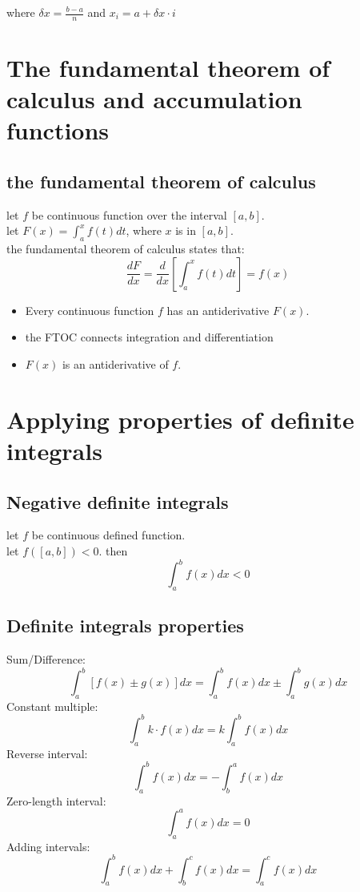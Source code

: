 \documentclass{article}
\begin{document}
                where  \(\delta x = \frac{b - a}{n}\) and \(x_i = a + \delta x \cdot i\)
        \section{The fundamental theorem of calculus and accumulation functions}
                \subsection{the fundamental theorem of calculus}
                    let \(f\) be continuous function over the interval \([a, b]\).\\ 
                    let \(F(x) = \int_{a}^{x} f(t)dt\), where \(x\) is in \([a,b]\).\\
                    the fundamental theorem of calculus states that: 
                    \[\frac{dF}{dx} = \frac{d}{dx}[\int_{a}^{x} f(t)dt]= f(x)\]
                    \begin{itemize}
                        \item Every continuous function \(f\) has an antiderivative \(F(x)\). 
                        \item the FTOC connects integration and differentiation
                        \item \(F(x)\) is an antiderivative of \(f\).
                    \end{itemize}
        \section{Applying properties of definite integrals}
                \subsection{Negative definite integrals}
                    let \(f\) be continuous defined function.\\ 
                    let \(f([a,b]) < 0\). 
                    then 
                        \[\int_{a}^{b} f(x)dx < 0\]
                \subsection{Definite integrals properties}
                    Sum/Difference: 
                        \[\int_{a}^{b}[f(x) \pm g(x)]dx = \int_{a}^{b} f(x)dx \pm \int_{a}^{b} g(x)dx\]
                    Constant multiple: 
                        \[\int_{a}^{b} k \cdot f(x)dx = k \int_{a}^{b} f(x)dx\]
                    Reverse interval: 
                        \[\int_{a}^{b} f(x)dx = - \int_{b}^{a} f(x)dx\]
                    Zero-length interval: 
                        \[\int_{a}^{a} f(x)dx = 0\]
                    Adding intervals: 
                        \[\int_{a}^{b} f(x)dx + \int_{b}^{c} f(x)dx = \int_{a}^{c} f(x)dx \]
\end{document}
